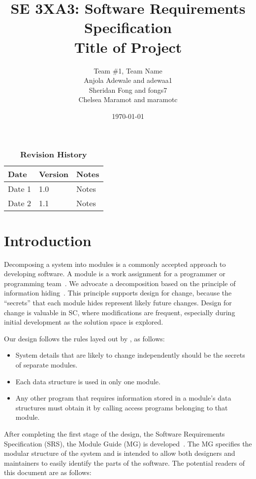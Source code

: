 \documentclass[12pt, titlepage]{article}
\title{SE 3XA3: Software Requirements Specification\\Title of Project}
\author{Team \#1, Team Name
		\\ Anjola Adewale and adewaa1
		\\ Sheridan Fong and fongs7
		\\ Chelsea Maramot and maramotc
}
\date{\today}
\begin{document}
\maketitle

\tableofcontents
\listoftables
\listoffigures

\begin{table}[bp]
\caption{\bf Revision History}
\begin{tabularx}{\textwidth}{p{3cm}p{2cm}X}
\toprule {\bf Date} & {\bf Version} & {\bf Notes}\\
\midrule
Date 1 & 1.0 & Notes\\
Date 2 & 1.1 & Notes\\
\bottomrule
\end{tabularx}
\end{table}

\newpage



\section{Introduction}

Decomposing a system into modules is a commonly accepted approach to developing
software.  A module is a work assignment for a programmer or programming
team~\citep{ParnasEtAl1984}.  We advocate a decomposition
based on the principle of information hiding~\citep{Parnas1972a}.  This
principle supports design for change, because the ``secrets'' that each module
hides represent likely future changes.  Design for change is valuable in SC,
where modifications are frequent, especially during initial development as the
solution space is explored.  

Our design follows the rules layed out by \citet{ParnasEtAl1984}, as follows:
\begin{itemize}
\item System details that are likely to change independently should be the
  secrets of separate modules.
\item Each data structure is used in only one module.
\item Any other program that requires information stored in a module's data
  structures must obtain it by calling access programs belonging to that module.
\end{itemize}

After completing the first stage of the design, the Software Requirements
Specification (SRS), the Module Guide (MG) is developed~\citep{ParnasEtAl1984}. The MG
specifies the modular structure of the system and is intended to allow both
designers and maintainers to easily identify the parts of the software.  The
potential readers of this document are as follows:
\end{document}
